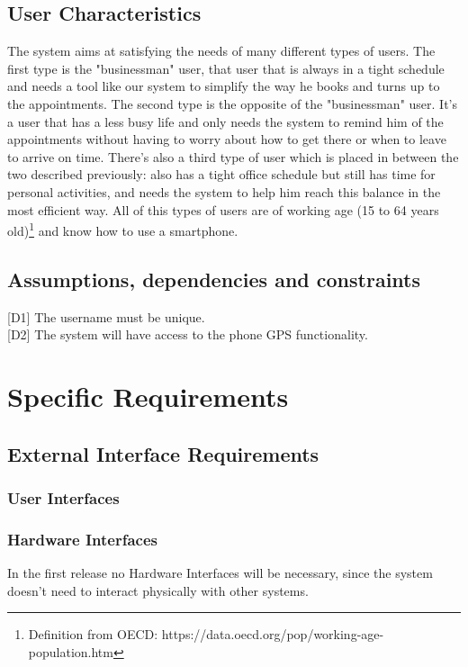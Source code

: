 \documentclass[12pt]{article}
\begin{document}
\subsection{User Characteristics}
The system aims at satisfying the needs of many different types of users. The first type is the "businessman" user, that user that is always in a tight schedule and needs a tool like our system to simplify the way he books and turns up to the appointments. The second type is the opposite of the "businessman" user. It's a user that has a less busy life and only needs the system to remind him of the appointments without having to worry about how to get there or when to leave to arrive on time. There's also a third type of user which is placed in between the two described previously: also has a tight office schedule but still has time for personal activities, and needs the system to help him reach this balance in the most efficient way.
All of this types of users are of working age (15 to 64 years old)\footnote{Definition from OECD: https://data.oecd.org/pop/working-age-population.htm} and know how to use a smartphone.

\subsection{Assumptions, dependencies and constraints}
[D1] The username must be unique.\\{}
[D2] The system will have access to the phone GPS functionality.

\section{Specific Requirements}

\subsection{External Interface Requirements}

\subsubsection{User Interfaces}

\subsubsection{Hardware Interfaces}
In the first release no Hardware Interfaces will be necessary, since the system doesn't need to interact physically with other systems.
\end{document}

